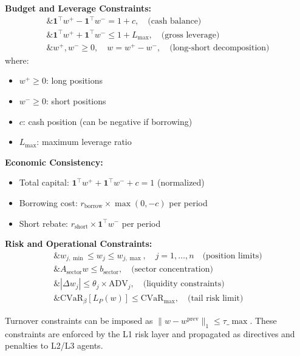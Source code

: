 \documentclass[11pt,a4paper]{article}
\begin{document}
\textbf{Budget and Leverage Constraints:}
\begin{equation}
\begin{aligned}
\&\mathbf{1}^\top w^+ - \mathbf{1}^\top w^- = 1 + c, \quad \text{(cash balance)}\\
\&\mathbf{1}^\top w^+ + \mathbf{1}^\top w^- \leq 1 + L_{\max}, \quad \text{(gross leverage)}\\
\&w^+, w^- \geq 0, \quad w = w^+ - w^-, \quad \text{(long-short decomposition)}
\end{aligned}
\end{equation}
where:
\begin{itemize}
\item $w^+ \geq 0$: long positions
\item $w^- \geq 0$: short positions  
\item $c$: cash position (can be negative if borrowing)
\item $L_{\max}$: maximum leverage ratio

\end{itemize}
\textbf{Economic Consistency:}
\begin{itemize}
\item Total capital: $\mathbf{1}^\top w^+ + \mathbf{1}^\top w^- + c = 1$ (normalized)
\item Borrowing cost: $r_{\text{borrow}} \times \max(0, -c)$ per period
\item Short rebate: $r_{\text{short}} \times \mathbf{1}^\top w^-$ per period

\end{itemize}
\textbf{Risk and Operational Constraints:}
\begin{equation}
\begin{aligned}
\&w_{j,\min} \leq w_j \leq w_{j,\max}, \quad j = 1,\ldots,n\quad \text{(position limits)}\\
\&A_{\text{sector}} w \leq b_{\text{sector}}, \quad \text{(sector concentration)}\\
\&|\Delta w_j| \leq \theta_j \times \text{ADV}_j, \quad \text{(liquidity constraints)}\\
\&\text{CVaR}_{\beta}[L_P(w)] \leq \text{CVaR}_{\max}, \quad \text{(tail risk limit)}
\end{aligned}
\end{equation}

Turnover constraints can be imposed as $\|w-w^{\text{prev}}\|_1 \le \tau\_{\max}$. These constraints are enforced by the L1 risk layer and propagated as directives and penalties to L2/L3 agents.
\end{document}
